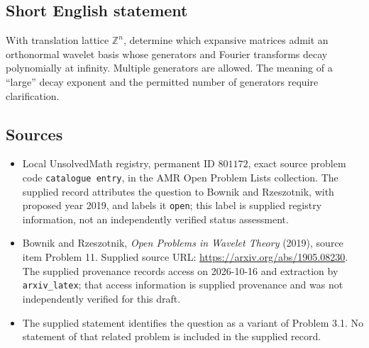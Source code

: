 \documentclass[11pt]{article}
\newcommand{\Z}{\mathbb{Z}}
\begin{document}
\subsection{Short English statement}
With translation lattice \(\Z^n\), determine which expansive matrices admit an orthonormal wavelet basis whose generators and Fourier transforms decay polynomially at infinity. Multiple generators are allowed. The meaning of a ``large'' decay exponent and the permitted number of generators require clarification.
\subsection{Sources}
\begin{itemize}
\item Local UnsolvedMath registry, permanent ID \(801172\), exact source problem code \texttt{catalogue entry}, in the AMR Open Problem Lists collection. The supplied record attributes the question to Bownik and Rzeszotnik, with proposed year 2019, and labels it \texttt{open}; this label is supplied registry information, not an independently verified status assessment.
\item Bownik and Rzeszotnik, \emph{Open Problems in Wavelet Theory} (2019), source item Problem 11. Supplied source URL: \url{https://arxiv.org/abs/1905.08230}. The supplied provenance records access on 2026-10-16 and extraction by \texttt{arxiv\_latex}; that access information is supplied provenance and was not independently verified for this draft.
\item The supplied statement identifies the question as a variant of Problem 3.1. No statement of that related problem is included in the supplied record.
\end{itemize}
\end{document}
